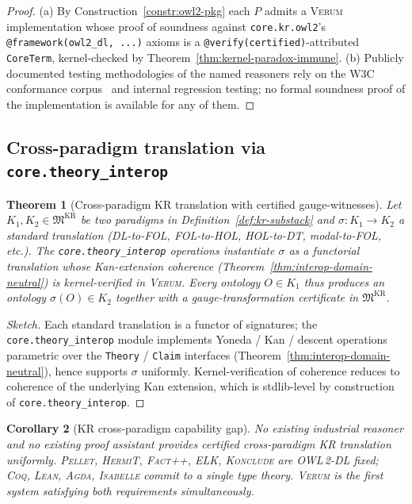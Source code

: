 \documentclass[11pt, a4paper]{article}
\newtheorem{theorem}{Theorem}[section]
\newtheorem{corollary}[theorem]{Corollary}
\theoremstyle{definition}
\theoremstyle{remark}
\newcommand{\fM}{\mathfrak{M}}
\newcommand{\Verum}{\textsc{Verum}}
\newcommand{\Coq}{\textsc{Coq}}
\newcommand{\Lean}{\textsc{Lean}}
\newcommand{\Agda}{\textsc{Agda}}
\newcommand{\Isabelle}{\textsc{Isabelle}}
\newcommand{\Pellet}{\textsc{Pellet}}
\newcommand{\HermiT}{\textsc{HermiT}}
\newcommand{\FactPP}{\textsc{Fact++}}
\newcommand{\ELK}{\textsc{ELK}}
\newcommand{\Konclude}{\textsc{Konclude}}
\newcommand{\OWL}{\textsc{OWL\,2}}
\begin{document}
\begin{proof}
(a) By Construction~\ref{constr:owl2-pkg} each $P$ admits a \Verum{} implementation whose proof of soundness against \texttt{core.kr.owl2}'s \texttt{@framework(owl2\_dl, ...)} axioms is a \texttt{@verify(certified)}-attributed \texttt{CoreTerm}, kernel-checked by Theorem~\ref{thm:kernel-paradox-immune}. (b) Publicly documented testing methodologies of the named reasoners rely on the W3C conformance corpus~\cite{OWL2Tests} and internal regression testing; no formal soundness proof of the implementation is available for any of them.
\end{proof}

\subsection{Cross-paradigm translation via \texttt{core.theory\_interop}}
\label{subsec:kr-cross-paradigm}

\begin{theorem}[Cross-paradigm KR translation with certified gauge-witnesses]
\label{thm:kr-cross-paradigm}
Let $K_1, K_2 \in \fM^{\mathrm{KR}}$ be two paradigms in Definition~\ref{def:kr-substack} and $\sigma : K_1 \to K_2$ a standard translation (DL-to-FOL, FOL-to-HOL, HOL-to-DT, modal-to-FOL, etc.). The \texttt{core.theory\_interop} operations instantiate $\sigma$ as a functorial translation whose Kan-extension coherence (Theorem~\ref{thm:interop-domain-neutral}) is kernel-verified in \Verum. Every ontology $O \in K_1$ thus produces an ontology $\sigma(O) \in K_2$ together with a gauge-transformation certificate in $\fM^{\mathrm{KR}}$.
\end{theorem}

\begin{proof}[Sketch]
Each standard translation is a functor of signatures; the \texttt{core.theory\_interop} module implements Yoneda / Kan / descent operations parametric over the \texttt{Theory} / \texttt{Claim} interfaces (Theorem~\ref{thm:interop-domain-neutral}), hence supports $\sigma$ uniformly. Kernel-verification of coherence reduces to coherence of the underlying Kan extension, which is stdlib-level by construction of \texttt{core.theory\_interop}.
\end{proof}

\begin{corollary}[KR cross-paradigm capability gap]
\label{cor:kr-cross-paradigm-gap}
No existing industrial reasoner and no existing proof assistant provides certified cross-paradigm KR translation uniformly. \Pellet, \HermiT, \FactPP, \ELK, \Konclude{} are \OWL-\textsc{DL} fixed; \Coq, \Lean, \Agda, \Isabelle{} commit to a single type theory. \Verum{} is the first system satisfying both requirements simultaneously.
\end{corollary}
\end{document}
